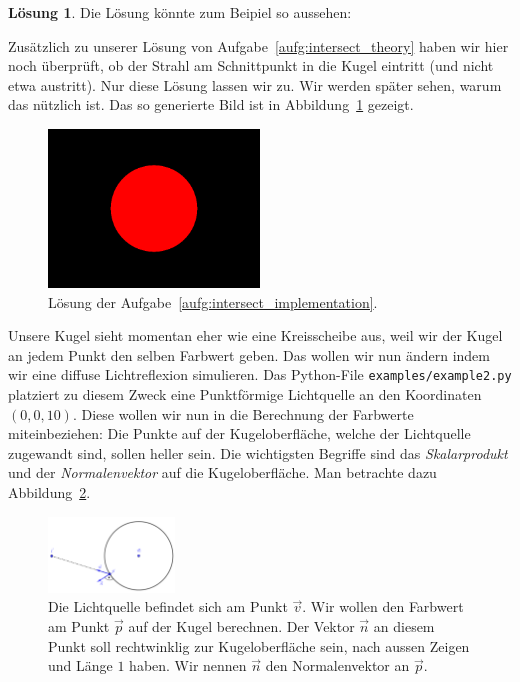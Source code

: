 \documentclass[12pt,a4paper]{article}
\theoremstyle{definition}
\theoremstyle{definition}
\newtheorem*{losung*}{Lösung}
\begin{document}
	\begin{losung*}
		Die Lösung könnte zum Beipiel so aussehen:
		
		Zusätzlich zu unserer Lösung von Aufgabe~\ref{aufg:intersect_theory} haben wir hier noch überprüft, ob der Strahl am Schnittpunkt in die Kugel eintritt (und nicht etwa austritt).
		Nur diese Lösung lassen wir zu.
		Wir werden später sehen, warum das nützlich ist.
		Das so generierte Bild ist in Abbildung~\ref{fig:solution_sphere} gezeigt.
		\begin{figure}[ht]
			\centering
			\includegraphics[width=0.5\textwidth]{images/example1.png}
			\caption{Lösung der Aufgabe~\ref{aufg:intersect_implementation}.}
			\label{fig:solution_sphere}
		\end{figure}
	\end{losung*}
	Unsere Kugel sieht momentan eher wie eine Kreisscheibe aus, weil wir der Kugel an jedem Punkt den selben Farbwert geben.
	Das wollen wir nun ändern indem wir eine diffuse Lichtreflexion simulieren.
	Das Python-File \texttt{examples/example2.py} platziert zu diesem Zweck eine Punktförmige Lichtquelle an den Koordinaten $(0,0,10)$.
	Diese wollen wir nun in die Berechnung der Farbwerte miteinbeziehen:
	Die Punkte auf der Kugeloberfläche, welche der Lichtquelle zugewandt sind, sollen heller sein.
	Die wichtigsten Begriffe sind das \textit{Skalarprodukt} und der \textit{Normalenvektor} auf die Kugeloberfläche.
	Man betrachte dazu Abbildung~\ref{fig:sphere_diffuse}.
	\begin{figure}
		\centering
		\includegraphics[width=0.3\textwidth]{images/sphere_diffuse.pdf}
		\caption{Die Lichtquelle befindet sich am Punkt $\vec{v}$. Wir wollen den Farbwert am Punkt $\vec{p}$ auf der Kugel berechnen. Der Vektor $\vec{n}$ an diesem Punkt soll rechtwinklig zur Kugeloberfläche sein, nach aussen Zeigen und Länge $1$ haben. Wir nennen $\vec{n}$ den Normalenvektor an $\vec{p}$.}
	\label{fig:sphere_diffuse}
	\end{figure}
\end{document}
